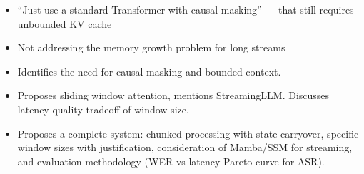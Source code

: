 \begin{interviewq}
\redflags
\begin{itemize}
    \item ``Just use a standard Transformer with causal masking'' --- that still requires unbounded KV cache
    \item Not addressing the memory growth problem for long streams
\end{itemize}


\goodgreat
\begin{itemize}
    \item {} Identifies the need for causal masking and bounded context.
    \item {} Proposes sliding window attention, mentions StreamingLLM. Discusses latency-quality tradeoff of window size.
    \item {} Proposes a complete system: chunked processing with state carryover, specific window sizes with justification, consideration of Mamba/SSM for streaming, and evaluation methodology (WER vs latency Pareto curve for ASR).
\end{itemize}

\end{interviewq}

